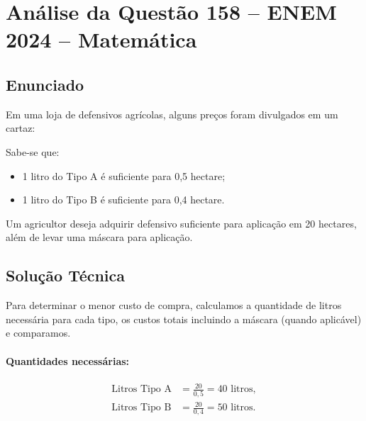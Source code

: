 \documentclass{article}
\begin{document}
\section*{Análise da Questão 158 – ENEM 2024 – Matemática}

\subsection*{Enunciado}
Em uma loja de defensivos agrícolas, alguns preços foram divulgados em um cartaz:
Sabe-se que:
\begin{itemize}
  \item 1 litro do Tipo A é suficiente para 0,5 hectare;
  \item 1 litro do Tipo B é suficiente para 0,4 hectare.
\end{itemize}
Um agricultor deseja adquirir defensivo suficiente para aplicação em 20 hectares, além de levar uma máscara para aplicação.

\subsection*{Solução Técnica}

Para determinar o menor custo de compra, calculamos a quantidade de litros necessária para cada tipo, os custos totais incluindo a máscara (quando aplicável) e comparamos.

\paragraph{Quantidades necessárias:}
\begin{align*}
\text{Litros Tipo A} &= \frac{20}{0{,}5} = 40 \text{ litros}, \\
\text{Litros Tipo B} &= \frac{20}{0{,}4} = 50 \text{ litros}.
\end{align*}
\end{document}
